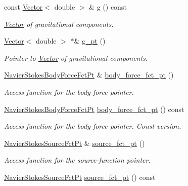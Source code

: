 \begin{DoxyCompactItemize}
const \hyperlink{classoomph_1_1Vector}{Vector}$<$ double $>$ \& \hyperlink{classoomph_1_1PolarNavierStokesEquations_a2cc16c167589971e1598cbfb8d35af25}{g} () const
\begin{DoxyCompactList}\small\item\em \hyperlink{classoomph_1_1Vector}{Vector} of gravitational components. \end{DoxyCompactList}\item 
\hyperlink{classoomph_1_1Vector}{Vector}$<$ double $>$ $\ast$\& \hyperlink{classoomph_1_1PolarNavierStokesEquations_a30ecb966cddb692a2095ffc40aa7e184}{g\+\_\+pt} ()
\begin{DoxyCompactList}\small\item\em Pointer to \hyperlink{classoomph_1_1Vector}{Vector} of gravitational components. \end{DoxyCompactList}\item 
\hyperlink{classoomph_1_1PolarNavierStokesEquations_adfe008551ad8039abe5c9bf23af8c0e3}{Navier\+Stokes\+Body\+Force\+Fct\+Pt} \& \hyperlink{classoomph_1_1PolarNavierStokesEquations_a1c290eda6d3f6b19bb1499aeb4b6d3ef}{body\+\_\+force\+\_\+fct\+\_\+pt} ()
\begin{DoxyCompactList}\small\item\em Access function for the body-\/force pointer. \end{DoxyCompactList}\item 
\hyperlink{classoomph_1_1PolarNavierStokesEquations_adfe008551ad8039abe5c9bf23af8c0e3}{Navier\+Stokes\+Body\+Force\+Fct\+Pt} \hyperlink{classoomph_1_1PolarNavierStokesEquations_af72a9132b8efe219c37ff569f2b7d77f}{body\+\_\+force\+\_\+fct\+\_\+pt} () const
\begin{DoxyCompactList}\small\item\em Access function for the body-\/force pointer. Const version. \end{DoxyCompactList}\item 
\hyperlink{classoomph_1_1PolarNavierStokesEquations_a9084ecf962b26ccaa72443a807dedb25}{Navier\+Stokes\+Source\+Fct\+Pt} \& \hyperlink{classoomph_1_1PolarNavierStokesEquations_a81a9738dda601340f31fe0a3c6d4ceff}{source\+\_\+fct\+\_\+pt} ()
\begin{DoxyCompactList}\small\item\em Access function for the source-\/function pointer. \end{DoxyCompactList}\item 
\hyperlink{classoomph_1_1PolarNavierStokesEquations_a9084ecf962b26ccaa72443a807dedb25}{Navier\+Stokes\+Source\+Fct\+Pt} \hyperlink{classoomph_1_1PolarNavierStokesEquations_ae96ba2b2234252b7f7b1d2de1420db97}{source\+\_\+fct\+\_\+pt} () const

\end{DoxyCompactItemize}
